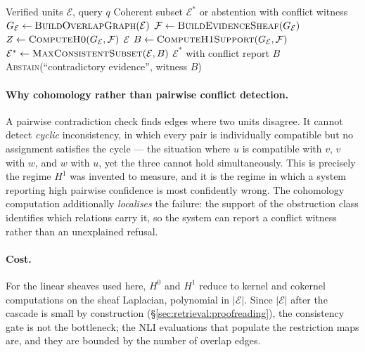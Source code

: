 \begin{algorithm}[H]
\caption{Consistency Gate}
\label{alg:consistency-gate}
\begin{algorithmic}[1]
\Require Verified units $\mathcal{E}$, query $q$
\Ensure Coherent subset $\mathcal{E}^*$ or abstention with conflict witness
\State $G_{\mathcal{E}} \gets \textsc{BuildOverlapGraph}(\mathcal{E})$
\State $\mathcal{F} \gets \textsc{BuildEvidenceSheaf}(G_{\mathcal{E}})$ 
\State $Z \gets \textsc{ComputeH0}(G_{\mathcal{E}}, \mathcal{F})$ 
  \State \Return $\mathcal{E}$ 
\EndIf
\State $B \gets \textsc{ComputeH1Support}(G_{\mathcal{E}}, \mathcal{F})$ 
\State $\mathcal{E}^* \gets \textsc{MaxConsistentSubset}(\mathcal{E}, B)$
  \State \Return $\mathcal{E}^*$ with conflict report $B$
\EndIf
\State \Return \textsc{Abstain}(``contradictory evidence'', witness $B$)
\end{algorithmic}
\end{algorithm}

\paragraph{Why cohomology rather than pairwise conflict detection.} A pairwise contradiction check finds edges where two units disagree. It cannot detect \emph{cyclic} inconsistency, in which every pair is individually compatible but no assignment satisfies the cycle --- the situation where $u$ is compatible with $v$, $v$ with $w$, and $w$ with $u$, yet the three cannot hold simultaneously. This is precisely the regime $H^1$ was invented to measure, and it is the regime in which a system reporting high pairwise confidence is most confidently wrong. The cohomology computation additionally \emph{localises} the failure: the support of the obstruction class identifies which relations carry it, so the system can report a conflict witness rather than an unexplained refusal.

\paragraph{Cost.} For the linear sheaves used here, $H^0$ and $H^1$ reduce to kernel and cokernel computations on the sheaf Laplacian, polynomial in $|\mathcal{E}|$. Since $|\mathcal{E}|$ after the cascade is small by construction (\S\ref{sec:retrieval:proofreading}), the consistency gate is not the bottleneck; the NLI evaluations that populate the restriction maps are, and they are bounded by the number of overlap edges.

